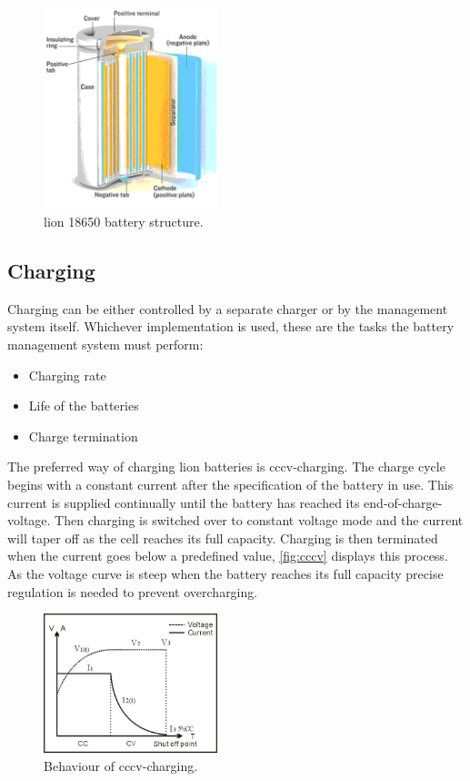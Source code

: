 \begin{figure}[H]
	\centering
	\includegraphics[width=0.45\textwidth]{Figures/cellstruct.png}
	\caption{\gls{lion} 18650 battery structure.}
	\label{fig:cellstruct}
\end{figure}

\subsection{Charging}

Charging can be either controlled by a separate charger or by the management system itself. Whichever implementation is used, these are the tasks the battery management system must perform\cite[p.111]{book}:

\begin{itemize}[noitemsep]
	\item Charging rate
	\item Life of the batteries
	\item Charge termination
\end{itemize}

The preferred way of charging \gls{lion} batteries is \gls{cccv}-charging. The charge cycle begins with a constant current after the specification of the battery in use. This current is supplied continually until the battery has reached its end-of-charge-voltage. Then charging is switched over to constant voltage mode and the current will taper off as the cell reaches its full capacity\cite{cccv}. Charging is then terminated when the current goes below a predefined value, \autoref{fig:cccv} displays this process. As the voltage curve is steep when the battery reaches its full capacity precise regulation is needed to prevent overcharging\cite[p.111-112]{book}.

\begin{figure}[H]
	\centering
	\includegraphics[width=0.45\textwidth]{Figures/cccv.jpg}
	\caption{Behaviour of \gls{cccv}-charging.}
	\label{fig:cccv}
\end{figure}

